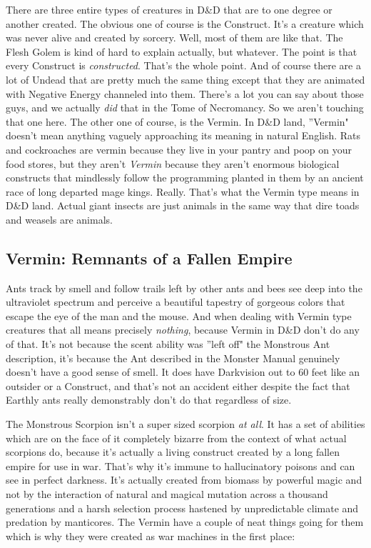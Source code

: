There are three entire types of creatures in D\&D that are to one degree or another created. The obvious one of course is the Construct. It's a creature which was never alive and created by sorcery. Well, most of them are like that. The Flesh Golem is kind of hard to explain actually, but whatever. The point is that every Construct is \textit{constructed}. That's the whole point. And of course there are a lot of Undead that are pretty much the same thing except that they are animated with Negative Energy channeled into them. There's a lot you can say about those guys, and we actually \textit{did} that in the Tome of Necromancy. So we aren't touching that one here. The other one of course, is the Vermin. In D\&D land, ''Vermin" doesn't mean anything vaguely approaching its meaning in natural English. Rats and cockroaches are vermin because they live in your pantry and poop on your food stores, but they aren't \textit{Vermin} because they aren't enormous biological constructs that mindlessly follow the programming planted in them by an ancient race of long departed mage kings. Really. That's what the Vermin type means in D\&D land. Actual giant insects are just animals in the same way that dire toads and weasels are animals.

\subsection{Vermin: Remnants of a Fallen Empire}
\vspace*{-8pt}

Ants track by smell and follow trails left by other ants and bees see deep into the ultraviolet spectrum and perceive a beautiful tapestry of gorgeous colors that escape the eye of the man and the mouse. And when dealing with Vermin type creatures that all means precisely \textit{nothing}, because Vermin in D\&D don't do any of that. It's not because the scent ability was ''left off" the Monstrous Ant description, it's because the Ant described in the Monster Manual genuinely doesn't have a good sense of smell. It does have Darkvision out to 60 feet like an outsider or a Construct, and that's not an accident either despite the fact that Earthly ants really demonstrably don't do that regardless of size.

The Monstrous Scorpion isn't a super sized scorpion \textit{at all}. It has a set of abilities which are on the face of it completely bizarre from the context of what actual scorpions do, because it's actually a living construct created by a long fallen empire for use in war. That's why it's immune to hallucinatory poisons and can see in perfect darkness. It's actually created from biomass by powerful magic and not by the interaction of natural and magical mutation across a thousand generations and a harsh selection process hastened by unpredictable climate and predation by manticores. The Vermin have a couple of neat things going for them which is why they were created as war machines in the first place:

